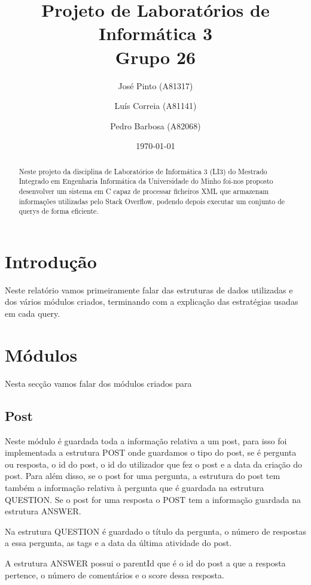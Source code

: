 \documentclass[a4paper]{article}
\title{Projeto de Laboratórios de Informática 3\\Grupo 26}
\author{José Pinto (A81317) \and Luís Correia (A81141) \and Pedro Barbosa (A82068)}
\date{\today}
\begin{document}
\maketitle

\begin{abstract}
  Neste projeto da disciplina de Laboratórios de Informática 3 (LI3) do Mestrado Integrado em Engenharia Informática da Universidade do Minho foi-nos proposto desenvolver um sistema em C capaz de processar ficheiros XML que armazenam informações utilizadas pelo Stack Overflow, podendo depois executar um conjunto de querys de forma eficiente.
\end{abstract}

\tableofcontents

\section{Introdução}
\label{sec:intro}

Neste relatório vamos primeiramente falar das estruturas de dados utilizadas e dos vários módulos criados, terminando com a explicação das estratégias usadas em cada query.  

\section{Módulos}
\label{sec:modulos}

Nesta secção vamos falar dos módulos criados para 

\subsection{Post}

	Neste módulo é guardada toda a informação relativa a um post, para isso foi implementada a estrutura POST onde guardamos o tipo do post, se é pergunta ou resposta, o id do post, o id do utilizador que fez o post e a data da criação do post. Para além disso, se o post for uma pergunta, a estrutura do post tem também a informação relativa à pergunta que é guardada na estrutura QUESTION. Se o post for uma resposta o POST tem a informação guardada na estrutura ANSWER.
	
	Na estrutura QUESTION é guardado o título da pergunta, o número de respostas a essa pergunta, as tags e a data da última atividade do post.
	
	A estrutura ANSWER possui o parentId que é o id do post a que a resposta pertence, o número de comentários e o score dessa resposta.
\end{document}
